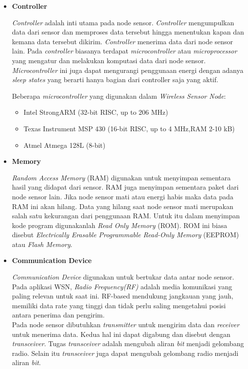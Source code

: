 \documentclass[a4paper,twoside]{article}
\begin{document}
\begin{enumerate}
\begin{itemize}
\item \textbf{Controller}

\textit{Controller} adalah inti utama pada node sensor. \textit{Controller} mengumpulkan data dari sensor dan memproses data tersebut hingga menentukan kapan dan kemana data tersebut dikirim. \textit{Controller} menerima data dari node sensor lain. Pada \textit{controller} biasanya terdapat \textit{microcontroller} atau \textit{microprocessor} yang mengatur dan melakukan komputasi data dari node sensor. \textit{Microcontroller} ini juga dapat mengurangi penggunaan energi dengan adanya \textit{sleep states} yang berarti hanya bagian dari controller saja yang aktif.

Beberapa \textit{microcontroller} yang digunakan dalam \textit{Wireless Sensor Node}:
\begin{itemize}
	\item Intel StrongARM (32-bit RISC, up to 206 MHz)
	\item Texas Instrument MSP 430 (16-bit RISC, up to 4 MHz,RAM 2-10 kB)
	\item Atmel Atmega 128L (8-bit)
\end{itemize}	
\end{itemize}
\begin{itemize}
\item \textbf{Memory}

\textit{Random Access Memory} (RAM) digunakan untuk menyimpan sementara hasil yang didapat dari sensor. RAM juga menyimpan sementara paket dari node sensor lain. Jika node sensor mati atau energi habis maka data pada RAM ini akan hilang. Data yang hilang saat node sensor mati merupakan salah satu kekurangan dari penggunaan RAM. Untuk itu dalam menyimpan kode program digunakanlah \textit{Read Only Memory} (ROM). ROM ini biasa disebut \textit{Electrically Erasable Programmable Read-Only Memory} (EEPROM) atau \textit{Flash Memory}.
\end{itemize}

\begin{itemize}
\item \textbf{Communication Device}

\textit{Communication Device} digunakan untuk bertukar data antar node sensor. Pada aplikasi WSN, \textit{Radio Frequency(RF)} adalah media komunikasi yang paling relevan untuk saat ini. RF-based mendukung jangkauan yang jauh, memiliki data rate yang tinggi dan tidak perlu saling mengetahui posisi antara penerima dan pengirim.
\\
Pada node sensor dibutuhkan \textit{transmitter} untuk mengirim data dan \textit{receiver} untuk menerima data. Kedua hal ini dapat digabung dan disebut dengan \textit{transceiver}. Tugas \textit{transceiver} adalah mengubah aliran \textit{bit} menjadi gelombang radio. Selain itu \textit{transceiver} juga dapat mengubah gelombang radio menjadi aliran \textit{bit}.
\end{itemize}


\end{enumerate}
\end{document}
